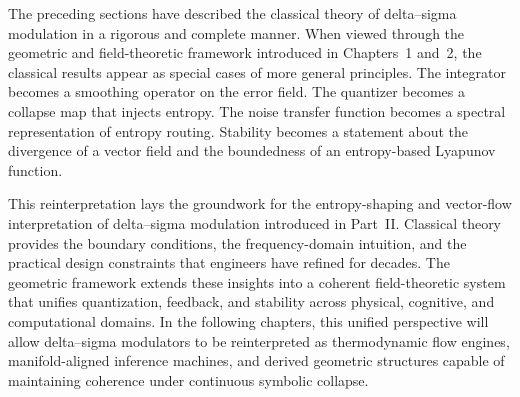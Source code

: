 The preceding sections have described the classical theory of delta--sigma modulation in a rigorous and complete manner. When viewed through the geometric and field-theoretic framework introduced in Chapters~1 and~2, the classical results appear as special cases of more general principles. The integrator becomes a smoothing operator on the error field. The quantizer becomes a collapse map that injects entropy. The noise transfer function becomes a spectral representation of entropy routing. Stability becomes a statement about the divergence of a vector field and the boundedness of an entropy-based Lyapunov function.

This reinterpretation lays the groundwork for the entropy-shaping and vector-flow interpretation of delta--sigma modulation introduced in Part~II. Classical theory provides the boundary conditions, the frequency-domain intuition, and the practical design constraints that engineers have refined for decades. The geometric framework extends these insights into a coherent field-theoretic system that unifies quantization, feedback, and stability across physical, cognitive, and computational domains. In the following chapters, this unified perspective will allow delta--sigma modulators to be reinterpreted as thermodynamic flow engines, manifold-aligned inference machines, and derived geometric structures capable of maintaining coherence under continuous symbolic collapse.
